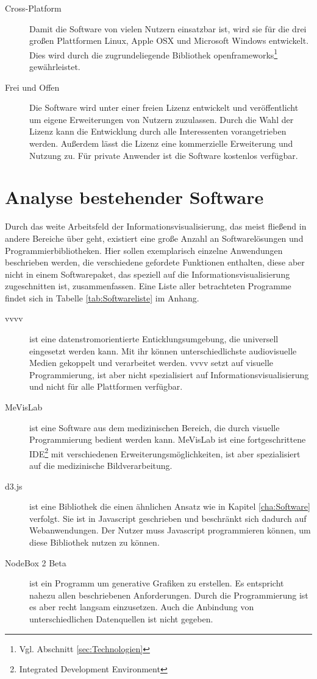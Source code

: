 \documentclass[a4paper, 12pt, DIVcalc, onepage, pdftex, headsepline, footsepline]{scrreprt}
\begin{document}
\begin{description}
\item[Cross-Platform]
Damit die Software von vielen Nutzern einsatzbar ist, wird sie für die
drei großen Plattformen Linux, Apple OSX und Microsoft Windows entwickelt.
Dies wird durch die zugrundeliegende Bibliothek
openframeworks\footnote{Vgl. Abschnitt \ref{sec:Technologien}} gewährleistet.
\item[Frei und Offen]
Die Software wird unter einer freien Lizenz entwickelt und veröffentlicht
um eigene Erweiterungen von Nutzern zuzulassen. Durch die Wahl der Lizenz kann
die Entwicklung durch alle Interessenten vorangetrieben werden. Außerdem lässt
die Lizenz eine kommerzielle Erweiterung und Nutzung zu. Für private Anwender
ist die Software kostenlos verfügbar.
\end{description}

\section{Analyse bestehender Software}
\label{sec:bestehendeSoftware}
Durch das weite Arbeitsfeld der Informationsvisualisierung, das meist
fließend in andere Bereiche über geht, existiert eine große Anzahl an
Softwarelösungen und Programmierbibliotheken. Hier sollen exemplarisch
einzelne Anwendungen beschrieben werden, die verschiedene gefordete
Funktionen enthalten, diese aber nicht in einem Softwarepaket, das
speziell auf die Informationsvisualisierung zugeschnitten ist, zusammenfassen.
Eine Liste aller betrachteten Programme findet sich in Tabelle
\ref{tab:Softwareliste} im Anhang.
\begin{description}
\item[vvvv]
ist eine datenstromorientierte Enticklungsumgebung, die universell eingesetzt werden kann.
Mit ihr können unterschiedlichste audiovisuelle Medien gekoppelt und
verarbeitet werden. vvvv setzt auf visuelle Programmierung, ist aber
nicht spezialisiert auf Informationsvisualisierung und nicht für alle
Plattformen verfügbar.
\item[MeVisLab]
ist eine Software aus dem medizinischen Bereich, die durch visuelle
Programmierung bedient werden kann. MeVisLab ist eine fortgeschrittene
IDE\footnote{Integrated Development Environment} mit verschiedenen
Erweiterungsmöglichkeiten, ist aber spezialisiert auf die medizinische
Bildverarbeitung.
\item[d3.js]
ist eine Bibliothek die einen ähnlichen Ansatz wie in Kapitel \ref{cha:Software}
verfolgt. Sie ist in Javascript geschrieben und beschränkt sich dadurch auf
Webanwendungen. Der Nutzer muss Javascript programmieren können, um diese
Bibliothek nutzen zu können.
\item[NodeBox 2 Beta]
ist ein Programm um generative Grafiken zu erstellen. Es entspricht nahezu
allen beschriebenen Anforderungen. Durch die Programmierung ist es aber recht
langsam einzusetzen. Auch die Anbindung von unterschiedlichen Datenquellen
ist nicht gegeben.
\end{description}
\end{document}
